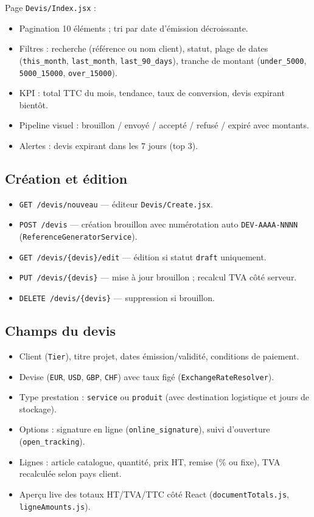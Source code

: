 \documentclass[11pt,a4paper]{report}
\newcommand{\route}[1]{\texttt{\small #1}}
\newcommand{\svc}[1]{\texttt{\small #1}}
\newcommand{\model}[1]{\texttt{\small #1}}
\begin{document}
Page \texttt{Devis/Index.jsx} :
\begin{itemize}[leftmargin=*]
    \item Pagination 10 éléments ; tri par date d'émission décroissante.
    \item Filtres : recherche (référence ou nom client), statut, plage de dates (\texttt{this\_month}, \texttt{last\_month}, \texttt{last\_90\_days}), tranche de montant (\texttt{under\_5000}, \texttt{5000\_15000}, \texttt{over\_15000}).
    \item KPI : total TTC du mois, tendance, taux de conversion, devis expirant bientôt.
    \item Pipeline visuel : brouillon / envoyé / accepté / refusé / expiré avec montants.
    \item Alertes : devis expirant dans les 7 jours (top 3).
\end{itemize}

\subsection{Création et édition}

\begin{itemize}[leftmargin=*]
    \item \route{GET /devis/nouveau} — éditeur \texttt{Devis/Create.jsx}.
    \item \route{POST /devis} — création brouillon avec numérotation auto \texttt{DEV-AAAA-NNNN} (\svc{ReferenceGeneratorService}).
    \item \route{GET /devis/\{devis\}/edit} — édition si statut \texttt{draft} uniquement.
    \item \route{PUT /devis/\{devis\}} — mise à jour brouillon ; recalcul TVA côté serveur.
    \item \route{DELETE /devis/\{devis\}} — suppression si brouillon.
\end{itemize}

\subsection{Champs du devis}

\begin{itemize}[leftmargin=*]
    \item Client (\model{Tier}), titre projet, dates émission/validité, conditions de paiement.
    \item Devise (\texttt{EUR}, \texttt{USD}, \texttt{GBP}, \texttt{CHF}) avec taux figé (\svc{ExchangeRateResolver}).
    \item Type prestation : \texttt{service} ou \texttt{produit} (avec destination logistique et jours de stockage).
    \item Options : signature en ligne (\texttt{online\_signature}), suivi d'ouverture (\texttt{open\_tracking}).
    \item Lignes : article catalogue, quantité, prix HT, remise (\% ou fixe), TVA recalculée selon pays client.
    \item Aperçu live des totaux HT/TVA/TTC côté React (\texttt{documentTotals.js}, \texttt{ligneAmounts.js}).
\end{itemize}
\end{document}
